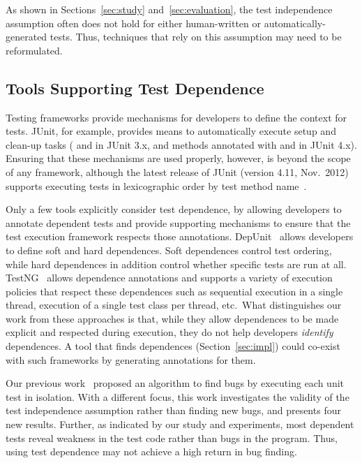 
As shown in Sections~\ref{sec:study} and~\ref{sec:evaluation},
the test independence assumption often does not hold for either
human-written or automatically-generated tests. Thus, techniques
that rely on this assumption may need to be reformulated.

\subsection{Tools Supporting Test Dependence}
\label{sec:supporting}

Testing frameworks provide mechanisms
for developers to define the context for tests.
JUnit, for example, provides means to
automatically execute setup and clean-up tasks
( and  in JUnit
3.x, and methods annotated with  and  in
JUnit 4.x). Ensuring that these mechanisms are used properly, however, is
beyond the scope of any framework, although the latest release of JUnit
(version 4.11, Nov.~2012)
supports executing tests in lexicographic order by test method name~\cite{junitordering}.


Only a few tools explicitly consider test dependence, by
allowing developers to annotate dependent tests and
provide supporting mechanisms to ensure that the test execution framework
respects those annotations.  DepUnit~\cite{depunit}
allows developers to define soft and hard dependences. Soft dependences control
test ordering, while hard dependences in addition control whether specific tests are
run at all.  TestNG~\cite{testng} 
allows dependence annotations and supports a variety of execution policies
that respect these dependences
such as sequential execution
in a single thread, execution of a single test class per thread, etc.\
What distinguishes our work from these approaches is that, while they allow dependences
to be made explicit and respected during execution, they do not help developers
\emph{identify} dependences.  A tool that finds dependences
(Section~\ref{sec:impl}) could co-exist
with such frameworks by generating annotations for them.

Our previous work~\cite{DBLP:conf/sigsoft/MusluSW11} proposed
an algorithm to find bugs by executing each unit
test in isolation. With a different focus,
this work investigates the validity of the test independence assumption
rather than finding new bugs,
and presents four new results.
Further, as indicated by our study and experiments, most dependent
tests reveal weakness in the test code rather than bugs in the program. Thus,
using test dependence may not achieve a high return in bug finding.

